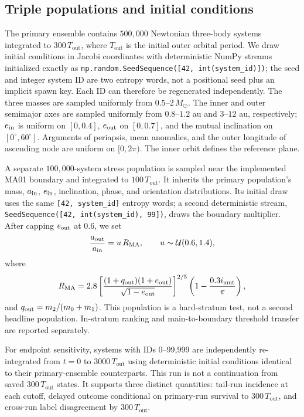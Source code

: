 \documentclass[linenumbers,twocolumn]{aastex702}
\newcommand{\Tout}{T_{\mathrm{out}}}
\begin{document}
\subsection{Triple populations and initial conditions}\label{sec:populations}

The primary ensemble contains $500{,}000$ Newtonian three-body systems integrated to $300\,\Tout$, where $\Tout$ is the initial outer orbital period. We draw initial conditions in Jacobi coordinates with deterministic NumPy streams initialized exactly as \texttt{np.random.SeedSequence([42, int(system\_id)])}; the seed and integer system ID are two entropy words, not a positional seed plus an implicit spawn key. Each ID can therefore be regenerated independently. The three masses are sampled uniformly from $0.5$--$2\,M_\odot$. The inner and outer semimajor axes are sampled uniformly from $0.8$--$1.2$ au and $3$--$12$ au, respectively; $e_{\rm in}$ is uniform on $[0,0.4]$, $e_{\rm out}$ on $[0,0.7]$, and the mutual inclination on $[0^\circ,60^\circ]$. Arguments of periapsis, mean anomalies, and the outer longitude of ascending node are uniform on $[0,2\pi)$. The inner orbit defines the reference plane.

A separate $100{,}000$-system stress population is sampled near the implemented MA01 boundary and integrated to $100\,\Tout$. It inherits the primary population's mass, $a_{\rm in}$, $e_{\rm in}$, inclination, phase, and orientation distributions. Its initial draw uses the same \texttt{[42, system\_id]} entropy words; a second deterministic stream, \texttt{SeedSequence([42, int(system\_id), 99])}, draws the boundary multiplier. After capping $e_{\rm out}$ at 0.6, we set
\begin{equation}
 \frac{a_{\rm out}}{a_{\rm in}} = u\,R_{\rm MA},
 \qquad u\sim\mathcal{U}(0.6,1.4),
\end{equation}
where
\begin{equation}
 R_{\rm MA}=2.8\left[\frac{(1+q_{\rm out})(1+e_{\rm out})}
 {\sqrt{1-e_{\rm out}}}\right]^{2/5}
 \left(1-\frac{0.3 i_{\rm mut}}{\pi}\right),
\end{equation}
and $q_{\rm out}=m_2/(m_0+m_1)$. This population is a hard-stratum test, not a second headline population. In-stratum ranking and main-to-boundary threshold transfer are reported separately.

For endpoint sensitivity, systems with IDs 0--99,999 are independently re-integrated from $t=0$ to $3000\,\Tout$ using deterministic initial conditions identical to their primary-ensemble counterparts. This run is not a continuation from saved $300\,\Tout$ states. It supports three distinct quantities: tail-run incidence at each cutoff, delayed outcome conditional on primary-run survival to $300\,\Tout$, and cross-run label disagreement by $300\,\Tout$.
\end{document}
